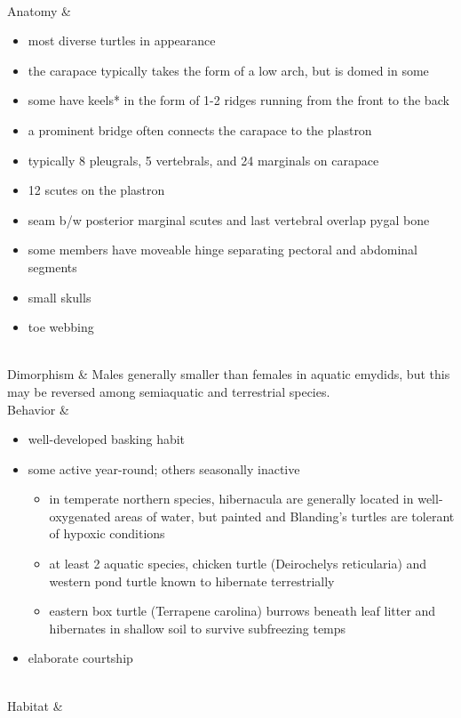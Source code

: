 \begin{center}
\begin{longtabu}
	 \\
	\hline
	Anatomy &
	\begin{itemize}[noitemsep]
		\item most diverse turtles in appearance
		\item the carapace typically takes the form of a low arch, but is domed in some
		\item some have keels* in the form of 1-2 ridges running from the front to the back
		\item a prominent bridge often connects the carapace to the plastron
		\item typically 8 pleugrals, 5 vertebrals, and 24 marginals on carapace
		\item 12 scutes on the plastron
		\item seam b/w posterior marginal scutes and last vertebral overlap pygal bone
		\item some members have moveable hinge separating pectoral and abdominal segments
		\item small skulls
		\item toe webbing
	\end{itemize}
	 \\
	\hline
	Dimorphism & 
	Males generally smaller than females in aquatic emydids, but this may be reversed among semiaquatic and terrestrial species.
	\\
	\hline
	Behavior & 
	\begin{itemize}[noitemsep]
		\item well-developed basking habit
		\item some active year-round; others seasonally inactive
			\begin{itemize}[noitemsep]
				\item in temperate northern species, hibernacula are generally located in well-oxygenated areas of water, but painted and Blanding's turtles are tolerant of hypoxic conditions
				\item at least 2 aquatic species, chicken turtle (Deirochelys reticularia) and western pond turtle known to hibernate terrestrially
				\item eastern box turtle  (Terrapene carolina) burrows beneath leaf litter and hibernates in shallow soil to survive subfreezing temps
			\end{itemize}
		\item elaborate courtship
	\end{itemize}
	\\
	\hline
	Habitat & 
	\begin{itemize}[noitemsep]

\end{itemize}
\end{longtabu}
\end{center}
